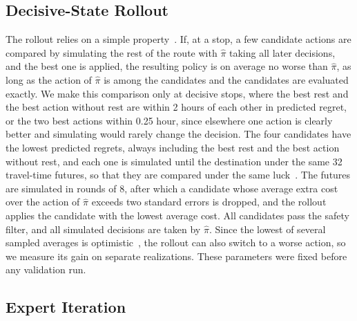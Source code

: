 \documentclass[runningheads]{llncs}
\begin{document}
\subsection{Decisive-State Rollout}

The rollout relies on a simple property~\cite{bertsekas1997}. If, at a stop, a
few candidate actions are compared by simulating the rest of the route with
$\hat\pi$ taking all later decisions, and the best one is applied, the
resulting policy is on average no worse than $\hat\pi$, as long as the action
of $\hat\pi$ is among the candidates and the candidates are evaluated exactly.
We make this comparison only at decisive stops, where the best rest and the
best action without rest are within 2 hours of each other in predicted regret,
or the two best actions within 0.25 hour, since elsewhere one action is
clearly better and simulating would rarely change the decision. The four
candidates have the lowest predicted regrets, always including the best rest
and the best action without rest, and each one is simulated until the
destination under the same 32 travel-time futures, so that they are compared
under the same luck~\cite{ng2000pegasus}. The futures are simulated in rounds
of 8, after which a candidate whose average extra cost over the action of
$\hat\pi$ exceeds two standard errors is dropped, and the rollout applies the
candidate with the lowest average cost. All candidates pass the safety filter,
and all simulated decisions are taken by $\hat\pi$. Since the lowest of
several sampled averages is optimistic~\cite{smith2006}, the rollout can also
switch to a worse action, so we measure its gain on separate realizations. These parameters were fixed before any validation run.

\subsection{Expert Iteration}
\end{document}
